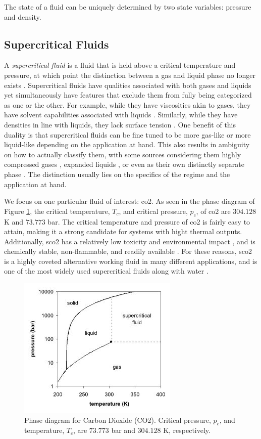 The state of a fluid can be uniquely determined by two state variables: pressure and density. 

\subsection{Supercritical Fluids}

A \textit{supercritical fluid} is a fluid that is held above a critical temperature and pressure, at which point the distinction between a gas and liquid phase no longer exists \cite{SCF2, SCF1}. Supercritical fluids have qualities associated with both gases and liquids yet simultaneously have features that exclude them from fully being categorized as one or the other. For example, while they have viscosities akin to gases, they have solvent capabilities associated with liquids \cite{}. Similarly, while they have densities in line with liquids, they lack surface tension \cite{}. One benefit of this duality is that supercritical fluids can be fine tuned to be more gas-like or more liquid-like depending on the application at hand. This also results in ambiguity on how to actually classify them, with some sources considering them highly compressed gases \cite{Gordon}, expanded liquids \cite{Aggarwal}, or even as their own distinctly separate phase \cite{BANUTI201512}. The distinction usually lies on the specifics of the regime and the application at hand. 

We focus on one particular fluid of interest: \gls{co2}. As seen in the phase diagram of Figure \ref{phase_diagram}, the critical temperature, $T_c$, and critical pressure, $p_c$, of \gls{co2} are $304.128 $ K and $73.773$ bar. The critical temperature and pressure of \gls{co2} is fairly easy to attain, making it a strong candidate for systems with hight thermal outputs. Additionally, \gls{sco2} has a relatively low toxicity and environmental impact \cite{}, and is chemically stable, non-flammable, and readily available \cite{}. For these reasons, \gls{sco2} is a highly coveted alternative working fluid in many different applications, and is one of the most widely used supercritical fluids along with water \cite{SCF2}. 

\begin{figure}[h!]
\begin{center}
\includegraphics[scale=.75]{figures/co2_phase_diagram}
\end{center}
\caption{Phase diagram for Carbon Dioxide (CO2). Critical pressure, $p_c$, and temperature, $T_c$, are $73.773$ bar and $304.128$ K, respectively.}
\label{phase_diagram}
\end{figure}

